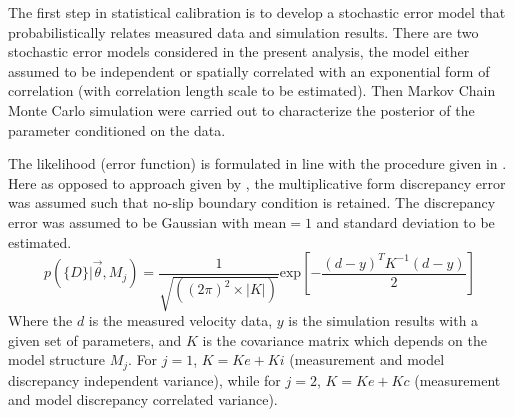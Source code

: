 \documentclass[11pt,titlepage]{article}
\begin{document}
The first step in statistical calibration is to develop a stochastic error model that probabilistically relates measured data and simulation results. 
There are two stochastic error models considered in the present analysis, the model either assumed to be independent or spatially correlated with an exponential form of correlation (with correlation length scale to be estimated). 
Then Markov Chain Monte Carlo simulation were carried out to characterize the posterior of the parameter conditioned on the data.

The likelihood (error function) is formulated in line with the procedure given in \cite{Cheung2011}. 
Here as opposed to approach given by \cite{KennedyOHagan2001}, the multiplicative form discrepancy error was assumed such that no-slip boundary condition is retained. 
The discrepancy error was assumed to be Gaussian with mean$=1$ and standard deviation to be estimated.
\begin{equation}
p(\{D\} | \vec{\theta}, M_j) = \frac{1}{\sqrt{((2\pi)^2 \times|K|)}} \text{exp} \left[ - \frac{(d-y)^T K^{-1} (d-y)}{2} \right]
\end{equation}
Where the $d$ is the measured velocity data, $y$ is the simulation results with a given set of parameters, and $K$ is the covariance matrix which depends on the model structure $M_j$. 
For $j=1$, $K = Ke + Ki$ (measurement and model discrepancy independent variance), while for $j=2$, $K = Ke + Kc$ (measurement and model discrepancy correlated variance).
\end{document}
